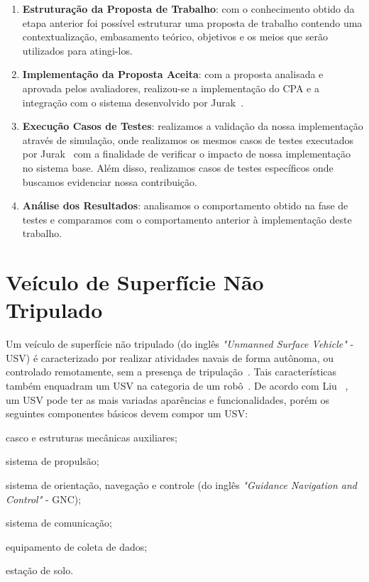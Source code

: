 \begin{enumerate}[label=\alph*)]
            \item \textbf{Estruturação da Proposta de Trabalho}: com o conhecimento obtido da etapa anterior foi possível estruturar uma proposta de trabalho contendo uma contextualização, embasamento teórico, objetivos e os meios que serão utilizados para atingi-los.
            
            \item \textbf{Implementação da Proposta Aceita}: com a proposta analisada e aprovada pelos avaliadores, realizou-se a implementação do CPA e a integração com o sistema desenvolvido por Jurak~\cite{Jurak2020COLREGS}.
            
            \item \textbf{Execução Casos de Testes}: realizamos a validação da nossa implementação através de simulação, onde realizamos os mesmos casos de testes executados por Jurak~\cite{Jurak2020COLREGS} com a finalidade de verificar o impacto de nossa implementação no sistema base. Além disso, realizamos casos de testes específicos onde buscamos evidenciar nossa contribuição.
            
            \item \textbf{Análise dos Resultados}: analisamos o comportamento obtido na fase de testes e comparamos com o comportamento anterior à implementação deste trabalho.
        \end{enumerate}
    
    \section{Veículo de Superfície Não Tripulado}\label{subchap2:USV}
        Um veículo de superfície não tripulado (do inglês \textit{"Unmanned Surface Vehicle"} - USV) é caracterizado por realizar atividades navais de forma autônoma, ou controlado remotamente, sem a presença de tripulação~\cite{Liu2016Unmanned}. Tais características também enquadram um USV na categoria de um robô~\cite{Jurak2020COLREGS}.
        De acordo com Liu \etal~\cite{Liu2016Unmanned}, um USV pode ter as mais variadas aparências e funcionalidades, porém os seguintes componentes básicos devem compor um USV: 
        \begin{enumerate*}[label=\alph*)]
            \item casco e estruturas mecânicas auxiliares;
            \item sistema de propulsão;
            \item sistema de orientação, navegação e controle (do inglês \textit{"Guidance Navigation and Control"} - GNC);
            \item sistema de comunicação;
            \item equipamento de coleta de dados;
            \item estação de solo.
        \end{enumerate*}
        
